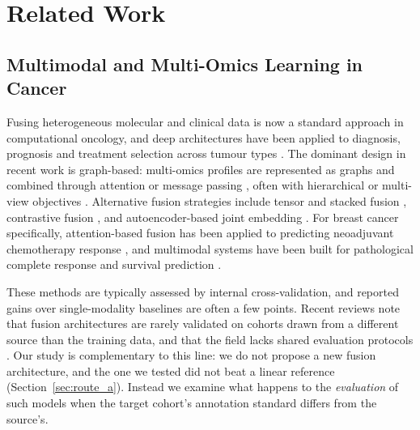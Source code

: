 \documentclass[10pt,journal,compsoc,twocolumn]{IEEEtran}
\begin{document}
\section{Related Work}
\label{sec:related}

\subsection{Multimodal and Multi-Omics Learning in Cancer}
Fusing heterogeneous molecular and clinical data is now a standard approach in computational oncology, and deep architectures have been applied to diagnosis, prognosis and treatment selection across tumour types \cite{tran2021deep,poirion2021deepprog,moon2023machine,jiang2024autosurv}. The dominant design in recent work is graph-based: multi-omics profiles are represented as graphs and combined through attention or message passing \cite{lin2026moagnn,fan2026cmgl,tan2025amogel,dou2025mogcan,zhang2025hallmarkgraph,tanvir2024mogat,xiao2023graph,zhang2025multiomics,li2024graphnn}, often with hierarchical or multi-view objectives \cite{ren2024classifying,yang2024multimodal}. Alternative fusion strategies include tensor and stacked fusion \cite{zhang2024msfn}, contrastive fusion \cite{liu2023attentionbased}, and autoencoder-based joint embedding \cite{benkirane2023customics,chai2021integrating}. For breast cancer specifically, attention-based fusion has been applied to predicting neoadjuvant chemotherapy response \cite{zhang2025attentionbased}, and multimodal systems have been built for pathological complete response and survival prediction \cite{mao2025a,cheng2026aligned,jia2026dynamic}.

These methods are typically assessed by internal cross-validation, and reported gains over single-modality baselines are often a few points. Recent reviews note that fusion architectures are rarely validated on cohorts drawn from a different source than the training data, and that the field lacks shared evaluation protocols \cite{steyaert2023multimodal,li2024a,huang2024classifying,kibria2026decoding}. Our study is complementary to this line: we do not propose a new fusion architecture, and the one we tested did not beat a linear reference (Section~\ref{sec:route_a}). Instead we examine what happens to the \emph{evaluation} of such models when the target cohort's annotation standard differs from the source's.
\end{document}
